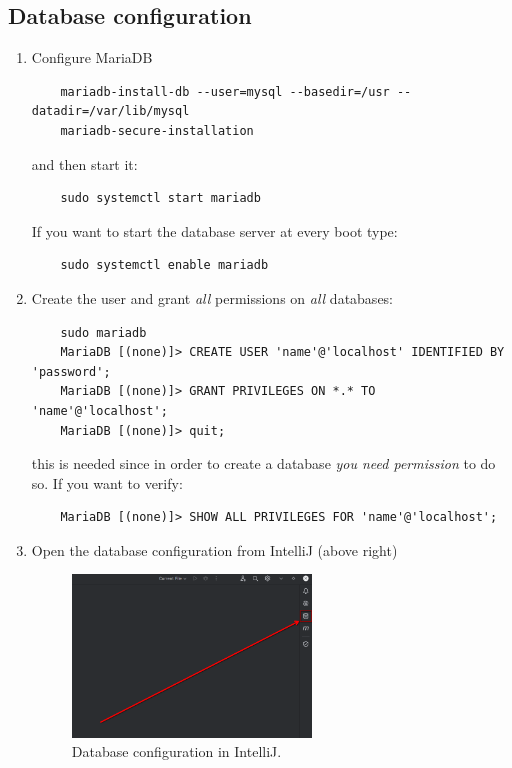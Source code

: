 \subsection{Database configuration}\label{sec: db_intellij}

\begin{enumerate}
  \item Configure MariaDB
    \begin{verbatim}
    mariadb-install-db --user=mysql --basedir=/usr --datadir=/var/lib/mysql
    mariadb-secure-installation
    \end{verbatim}
    and then start it:
    \begin{verbatim}
    sudo systemctl start mariadb
    \end{verbatim}
    If you want to start the database server at every boot type:
    \begin{verbatim}
    sudo systemctl enable mariadb
    \end{verbatim}

  \item Create the user and grant \emph{all} permissions on \emph{all} databases:
    \begin{verbatim}
    sudo mariadb
    MariaDB [(none)]> CREATE USER 'name'@'localhost' IDENTIFIED BY 'password';
    MariaDB [(none)]> GRANT PRIVILEGES ON *.* TO 'name'@'localhost';
    MariaDB [(none)]> quit;
    \end{verbatim}
    this is needed since in order to create a database \emph{you need permission} to do so. If you want to verify:
    \begin{verbatim}
    MariaDB [(none)]> SHOW ALL PRIVILEGES FOR 'name'@'localhost';
    \end{verbatim}

  \item Open the database configuration from IntelliJ (above right)
    \begin{figure}[H]
      \centering
      \includegraphics[width=0.6\textwidth]{img/intellij/intellij_8.png}
      \caption{Database configuration in IntelliJ.}
      \label{fig: intellij-db-config}
    \end{figure}


\end{enumerate}
